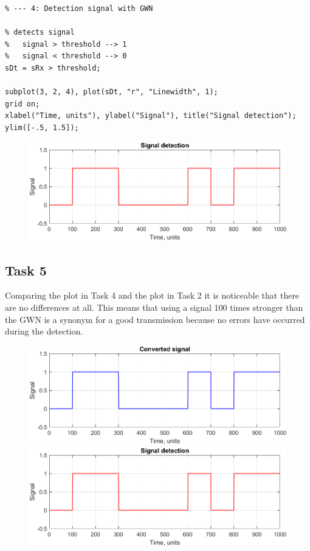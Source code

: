 \begin{lstlisting}
% --- 4: Detection signal with GWN

% detects signal
%   signal > threshold --> 1
%   signal < threshold --> 0
sDt = sRx > threshold;

subplot(3, 2, 4), plot(sDt, "r", "Linewidth", 1);
grid on;
xlabel("Time, units"), ylabel("Signal"), title("Signal detection");
ylim([-.5, 1.5]);
\end{lstlisting}
% 
\begin{figure}[h!]
    \centering
    \includegraphics[width = .8\textwidth]{lab-1/imgs/noise_detection_SNR20.png}
\end{figure}

% 
\subsection*{Task 5}
Comparing the plot in Task 4 and the plot in Task 2 it is noticeable that there are no differences at all. This means that using a signal 100 times stronger than the GWN is a synonym for a good transmission because no errors have occurred during the detection.

\begin{figure}[h!]
    \centering
    \includegraphics[width = .6\textwidth]{lab-1/imgs/converted_signal.png}
    \vspace{10 px}
    
    \includegraphics[width = .6\textwidth]{lab-1/imgs/noise_detection_SNR20.png}
\end{figure}

